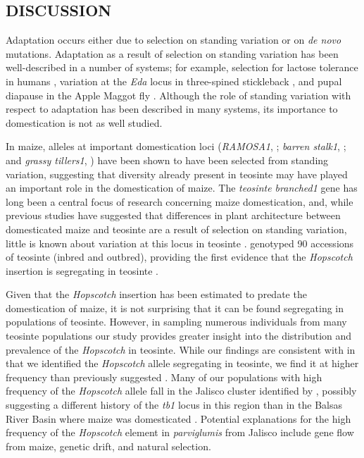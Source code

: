 \documentclass[11pt]{article}
\begin{document}
\begin{linenumbers}
\begin{flushleft}
\begin{centering}
\section*{DISCUSSION}
\end{centering}

Adaptation occurs either due to selection on standing variation or on \emph{de novo} mutations. Adaptation as a result of selection on standing variation has been well-described in a number of systems; for example, selection for lactose tolerance in humans \citep{Plantinga2012, Tishkoff2007}, variation at the \emph{Eda} locus in three-spined stickleback \citep{Kitano2008, Colosimo2005}, and pupal diapause in the Apple Maggot fly \citep{Feder2003}. Although the role of standing variation with respect to adaptation has been described in many systems, its importance to domestication is not as well studied. 

In maize, alleles at important domestication loci (\emph{RAMOSA1}, \citealt{SigmonVollbrecht2010}; \emph{barren stalk1}, \citealt{Gallavotti2004}; and \emph{grassy tillers1}, \citealt{Whipple2011}) have been shown to have been selected from standing variation, suggesting that diversity already present in teosinte may have played an important role in the domestication of maize. The \emph{teosinte branched1} gene has long been a central focus of research concerning maize domestication, and, while previous studies have suggested that differences in plant architecture between domesticated maize and teosinte are a result of selection on standing variation, little is known about variation at this locus in teosinte \citep{Clark2006, Studer2011}. \citet{Studer2011} genotyped 90 accessions of teosinte (inbred and outbred), providing the first evidence that the \emph{Hopscotch} insertion is segregating in teosinte \citep{Studer2011}. 

Given that the \emph{Hopscotch} insertion has been estimated to predate the domestication of maize, it is not surprising that it can be found segregating in populations of teosinte. However, in sampling numerous individuals from many teosinte populations our study provides greater insight into the distribution and prevalence of the \emph{Hopscotch} in teosinte. While our findings are consistent with \citet{Studer2011} in that we identified the \emph{Hopscotch} allele segregating in teosinte, we find it at higher frequency than previously suggested \citep{Studer2011}. Many of our populations with high frequency of the \emph{Hopscotch} allele fall in the Jalisco cluster identified by \citet{Fukunaga2005}, possibly suggesting a different history of the \emph{tb1} locus in this region than in the Balsas River Basin where maize was domesticated \citep{Matsuoka2002}. Potential explanations for the high frequency of the \emph{Hopscotch} element in \emph{parviglumis} from Jalisco include gene flow from maize, genetic drift, and natural selection. 


\end{flushleft}
\end{linenumbers}
\end{document}
